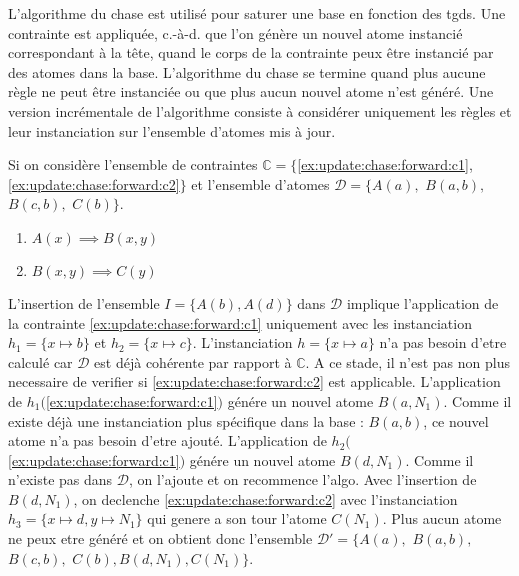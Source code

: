 L'algorithme du \gls{chase} \cite{ahoTheoryJoinsRelational1979,maierTestingImplicationsData1979} est utilisé pour saturer une base en fonction des \glspl{tgd}.
Une contrainte est appliquée, c.-à-d. que l'on génère un nouvel atome instancié correspondant à la tête, quand le corps de la contrainte peux être instancié par des atomes dans la base.
L'algorithme du \gls{chase} se termine quand plus aucune règle ne peut être instanciée ou que plus aucun nouvel atome n'est généré.
Une version incrémentale de l'algorithme consiste à considérer uniquement les règles et leur instanciation sur l'ensemble d'atomes mis à jour.

\begin{example}
    \label{ex:update:chase:forward}
    Si on considère l'ensemble de contraintes $\mathbb{C} = \{$\ref{ex:update:chase:forward:c1}, \ref{ex:update:chase:forward:c2}$\}$ et l'ensemble d'atomes $\mathcal{D} = \{A(a),$ $B(a, b),$ $B(c, b),$ $C(b)\}$.
    \begin{enumerate}[label=\textbf{$c_\arabic*$ :},ref=$c_\arabic*$]
        \item $A(x) \implies B(x, y)$ \label{ex:update:chase:forward:c1}
        \item $B(x, y) \implies C(y)$ \label{ex:update:chase:forward:c2}
    \end{enumerate}

    L'insertion de l'ensemble $I = \{A(b), A(d)\}$ dans $\mathcal{D}$ implique l'application de la contrainte \ref{ex:update:chase:forward:c1} uniquement avec les instanciation $h_1 = \{x \mapsto b\}$ et $h_2 = \{x \mapsto c\}$.
    L'instanciation $h = \{x \mapsto a\}$ n'a pas besoin d'etre calculé car $\mathcal{D}$ est déjà cohérente par rapport à $\mathbb{C}$.
    A ce stade, il n'est pas non plus necessaire de verifier si \ref{ex:update:chase:forward:c2} est applicable.
    L'application de $h_1($\ref{ex:update:chase:forward:c1}$)$ génére un nouvel atome $B(a, N_1)$.
    Comme il existe déjà une instanciation plus spécifique dans la base : $B(a, b)$, ce nouvel atome n'a pas besoin d'etre ajouté.
    L'application de $h_2($\ref{ex:update:chase:forward:c1}$)$ génére un nouvel atome $B(d, N_1)$.
    Comme il n'existe pas dans $\mathcal{D}$, on l'ajoute et on recommence l'algo.
    Avec l'insertion de $B(d, N_1)$, on declenche \ref{ex:update:chase:forward:c2} avec l'instanciation $h_3 = \{x \mapsto d, y \mapsto N_1\}$ qui genere a son tour l'atome $C(N_1)$.
    Plus aucun atome ne peux etre généré et on obtient donc l'ensemble $\mathcal{D}' = \{A(a),$ $B(a, b),$ $B(c, b),$ $C(b), B(d, N_1), C(N_1)\}$.
\end{example}

